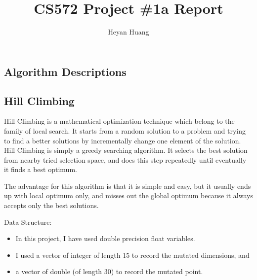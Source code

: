 \documentclass{article}
\title{CS572 Project \#1a Report}
\author{Heyan Huang}
\begin{document}
\begin{CJK}{UTF8}{gbsn}
\maketitle


\lstset{language=c++,
numbers=left, 
numberstyle=\tiny, 
escapeinside=``, 
extendedchars=false %
}


\section{Algorithm Descriptions}
\subsection{Hill Climbing}
\indent
   Hill Climbing is a mathematical optimization technique which belong to the family of local search. It starts from a random solution to a problem and trying to find a better solutions by incrementally change one element of the solution. Hill Climbing is simply a greedy searching algorithm. It selects the best solution from nearby tried selection space, and does this step repeatedly until eventually it finds a best optimum. 

The advantage for this algorithm is that it is simple and easy, but it usually ends up with local optimum only, and misses out the global optimum because it always accepts only the best solutions.
\begin{description}
\item Data Structure: 
  \begin{itemize}
    \itemsep=-3pt
  \item In this project, I have used double precision float variables. 
  \item I used a vector of integer of length 15 to record the mutated dimensions, and
  \item a vector of double (of length 30) to record the mutated point. 
  \end{itemize}


\end{description}
\end{CJK}
\end{document}
